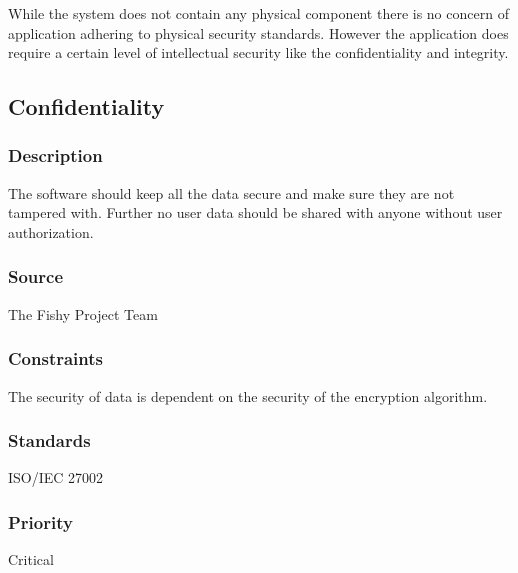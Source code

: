 While the system does not contain any physical component there is no concern of application adhering to physical security standards. However the application does require a certain level of intellectual security like the confidentiality and integrity.

\subsection{Confidentiality}
\subsubsection{Description}
The software should keep all the data secure and make sure they are not tampered with. Further no user data should be shared with anyone without user authorization.
\subsubsection{Source}
The Fishy Project Team
\subsubsection{Constraints}
The security of data is dependent on the security of the encryption algorithm.
\subsubsection{Standards}
ISO/IEC 27002
\subsubsection{Priority}
Critical